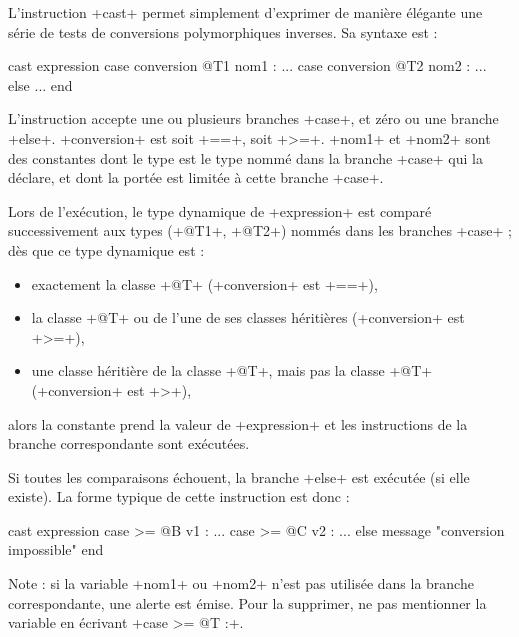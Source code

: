 L'instruction \ggs+cast+ permet simplement d'exprimer de manière élégante une série de tests de conversions polymorphiques inverses. Sa syntaxe est :

\begin{galgasbox}
cast expression
case conversion @T1 nom1 :
  ...
case conversion @T2 nom2 :
  ...
else
  ...
end
\end{galgasbox}

L'instruction accepte une ou plusieurs branches \ggs+case+, et zéro ou une branche \ggs+else+. \ggs+conversion+ est soit \ggs+==+, soit \ggs+>=+. \ggs+nom1+ et \ggs+nom2+ sont des constantes dont le type est le type nommé dans la branche \ggs+case+ qui la déclare, et dont la portée est limitée à cette branche \ggs+case+.

Lors de l'exécution, le type dynamique de \ggs+expression+ est comparé successivement aux types (\ggs+@T1+, \ggs+@T2+) nommés dans les branches \ggs+case+ ; dès que ce type dynamique est :
\begin{itemize}
  \item exactement la classe \ggs+@T+ (\ggs+conversion+ est \ggs+==+), 
  \item la classe \ggs+@T+ ou de l'une de ses classes héritières (\ggs+conversion+ est \ggs+>=+),
  \item une classe héritière de la classe \ggs+@T+, mais pas la classe \ggs+@T+ (\ggs+conversion+ est \ggs+>+),
\end{itemize}
alors la constante prend la valeur de \ggs+expression+ et les instructions de la branche correspondante sont exécutées.

Si toutes les comparaisons échouent, la branche \ggs+else+ est exécutée (si elle existe). La forme typique de cette instruction est donc :


\begin{galgasbox}
cast expression
case >= @B v1 :
  ...
case >= @C v2 :
  ...
else
  message "conversion impossible"
end
\end{galgasbox}

Note : si la variable \ggs+nom1+ ou  \ggs+nom2+ n'est pas utilisée dans la branche correspondante, une alerte est émise. Pour la supprimer, ne pas mentionner la variable en écrivant \ggs+case >= @T :+.










